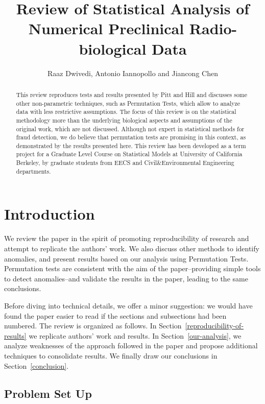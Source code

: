 \documentclass{article}
\title{Review of Statistical Analysis of Numerical Preclinical Radio-biological Data}
\author{Raaz Dwivedi,  Antonio Iannopollo and Jiancong Chen}
\begin{document}
    \maketitle



\begin{abstract}
This review reproduces tests and results
presented by Pitt and Hill and discusses some other non-parametric techniques, such as Permutation Tests, which allow to analyze data with less restrictive assumptions. 
The focus of this review is on the statistical methodology more than the underlying biological aspects and assumptions of the original work, which are not discussed.
Although not expert in statistical methods for fraud detection, we do believe that permutation tests are promising in this context, as demonstrated by the results presented here. 
This review has been developed as a term
project for a Graduate Level Course on Statistical Models at University of California Berkeley, by graduate
students from EECS and Civil\&Environmental Engineering departments.
\end{abstract}

\section{Introduction} %
\label{sec:introduction}


We review the paper in the spirit of promoting reproducibility of research and attempt to replicate the authors' work. We also discuss other methods to identify anomalies, and present results based on our analysis using Permutation Tests. Permutation tests are consistent with the aim of the paper--providing simple tools to detect anomalies--and validate the results in the paper, leading to the same conclusions.

Before diving into technical details, we offer a minor suggestion: we would have found the paper easier to read if the sections and subsections had been numbered.
The review is organized as follows.
In Section~\ref{reproducibility-of-results} we replicate authors' work and results. 
In Section~\ref{our-analysis}, we analyze weaknesses of the approach followed in the paper and propose additional techniques to consolidate results. 
We finally draw our conclusions in Section~\ref{conclusion}.

\subsection{Problem Set Up}\label{problem-set-up}
\end{document}
